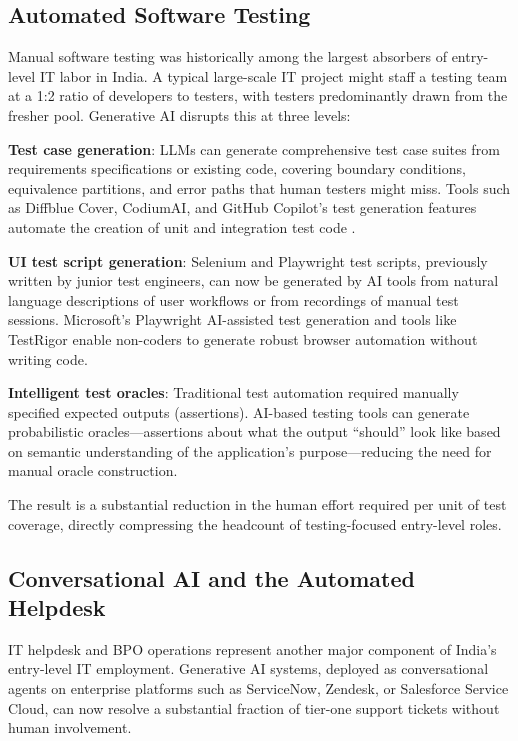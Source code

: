 \documentclass[conference]{IEEEtran}
\begin{document}
\subsection{Automated Software Testing}

Manual software testing was historically among the largest absorbers of entry-level IT labor in India. A typical large-scale IT project might staff a testing team at a 1:2 ratio of developers to testers, with testers predominantly drawn from the fresher pool. Generative AI disrupts this at three levels:

\textbf{Test case generation}: LLMs can generate comprehensive test case suites from requirements specifications or existing code, covering boundary conditions, equivalence partitions, and error paths that human testers might miss. Tools such as Diffblue Cover, CodiumAI, and GitHub Copilot's test generation features automate the creation of unit and integration test code \cite{schafer2023empirical}.

\textbf{UI test script generation}: Selenium and Playwright test scripts, previously written by junior test engineers, can now be generated by AI tools from natural language descriptions of user workflows or from recordings of manual test sessions. Microsoft's Playwright AI-assisted test generation and tools like TestRigor enable non-coders to generate robust browser automation without writing code.

\textbf{Intelligent test oracles}: Traditional test automation required manually specified expected outputs (assertions). AI-based testing tools can generate probabilistic oracles---assertions about what the output ``should'' look like based on semantic understanding of the application's purpose---reducing the need for manual oracle construction.

The result is a substantial reduction in the human effort required per unit of test coverage, directly compressing the headcount of testing-focused entry-level roles.

\subsection{Conversational AI and the Automated Helpdesk}

IT helpdesk and BPO operations represent another major component of India's entry-level IT employment. Generative AI systems, deployed as conversational agents on enterprise platforms such as ServiceNow, Zendesk, or Salesforce Service Cloud, can now resolve a substantial fraction of tier-one support tickets without human involvement.
\end{document}
